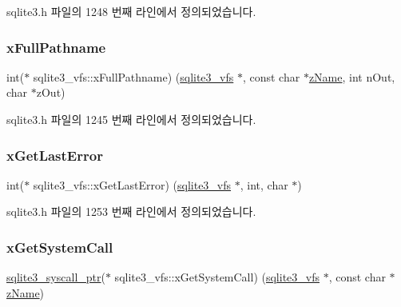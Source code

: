 sqlite3.\+h 파일의 1248 번째 라인에서 정의되었습니다.

\mbox{\label{structsqlite3__vfs_ae6573ffda4c4f014960b0ec3a1522dfa}} 
\subsubsection{\texorpdfstring{x\+Full\+Pathname}{xFullPathname}}
{\footnotesize\ttfamily int($\ast$ sqlite3\+\_\+vfs\+::x\+Full\+Pathname) (\hyperlink{structsqlite3__vfs}{sqlite3\+\_\+vfs} $\ast$, const char $\ast$\hyperlink{structsqlite3__vfs_a0f06a27ac2201ea04c0623ef19e5d73e}{z\+Name}, int n\+Out, char $\ast$z\+Out)}



sqlite3.\+h 파일의 1245 번째 라인에서 정의되었습니다.

\mbox{\label{structsqlite3__vfs_ae90895f142cc41801f515ae5e339a3d7}} 
\subsubsection{\texorpdfstring{x\+Get\+Last\+Error}{xGetLastError}}
{\footnotesize\ttfamily int($\ast$ sqlite3\+\_\+vfs\+::x\+Get\+Last\+Error) (\hyperlink{structsqlite3__vfs}{sqlite3\+\_\+vfs} $\ast$, int, char $\ast$)}



sqlite3.\+h 파일의 1253 번째 라인에서 정의되었습니다.

\mbox{\label{structsqlite3__vfs_a1bf78a1603ab605cd92d146e3f810727}} 
\subsubsection{\texorpdfstring{x\+Get\+System\+Call}{xGetSystemCall}}
{\footnotesize\ttfamily \hyperlink{sqlite3_8h_a99a6393e96d7095fa024de9c1257aa6f}{sqlite3\+\_\+syscall\+\_\+ptr}($\ast$ sqlite3\+\_\+vfs\+::x\+Get\+System\+Call) (\hyperlink{structsqlite3__vfs}{sqlite3\+\_\+vfs} $\ast$, const char $\ast$\hyperlink{structsqlite3__vfs_a0f06a27ac2201ea04c0623ef19e5d73e}{z\+Name})}



